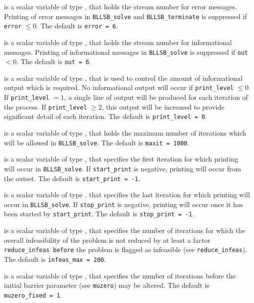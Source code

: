 \documentclass{galahad}
\newcommand{\packagename}{BLLSB}
\begin{document}
\begin{description}

 is a scalar variable of type \integer, that holds the
stream number for error messages. Printing of error messages in
{\tt \packagename\_solve} and {\tt \packagename\_terminate} is suppressed if
{\tt error} $\leq 0$.
The default is {\tt error = 6}.

 is a scalar variable of type \integer, that holds the
stream number for informational messages. Printing of informational messages in
{\tt \packagename\_solve} is suppressed if {\tt out} $< 0$.
The default is {\tt out = 6}.

 is a scalar variable of type \integer, that is used
to control the amount of informational output which is required. No
informational output will occur if {\tt print\_level} $\leq 0$. If
{\tt print\_level} $= 1$, a single line of output will be produced for each
iteration of the process. If {\tt print\_level} $\geq 2$, this output will be
increased to provide significant detail of each iteration.
The default is {\tt print\_level = 0}.

 is a scalar variable of type \integer, that holds the
maximum number of iterations which will be allowed in {\tt \packagename\_solve}.
The default is {\tt maxit = 1000}.

 is a scalar variable of type \integer, that specifies
the first iteration for which printing will occur in {\tt \packagename\_solve}.
If {\tt start\_print} is negative, printing will occur from the outset.
The default is {\tt start\_print = -1}.

 is a scalar variable of type \integer, that specifies
the last iteration for which printing will occur in  {\tt \packagename\_solve}.
If {\tt stop\_print} is negative, printing will occur once it has been
started by {\tt start\_print}.
The default is {\tt stop\_print = -1}.

 is a scalar variable of type \integer, that specifies
the number of iterations for which the overall infeasibility
of the problem is not reduced by at least a factor {\tt reduce\_infeas
before} the problem is flagged as infeasible (see {\tt reduce\_infeas}).
The default is {\tt infeas\_max = 200}.

 is a scalar variable of type \integer,
that specifies
the number of iterations before the initial barrier parameter
(see {\tt muzero}) may be altered.
The default is {\tt muzero\_fixed = 1}.


\end{description}
\end{document}
